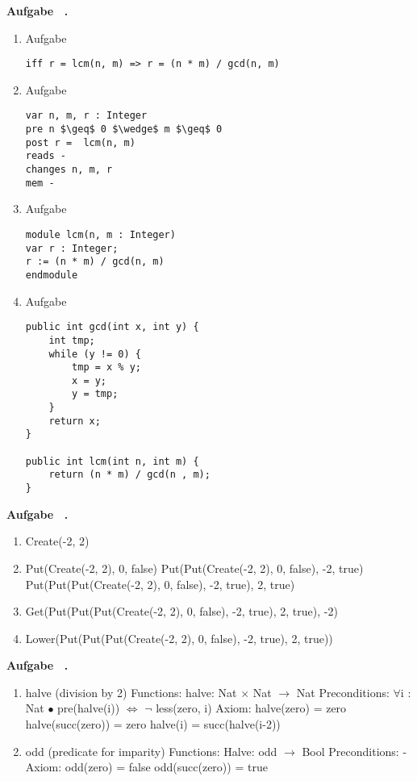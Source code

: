 \documentclass[a4paper,11pt]{article}             %
\def\vblatt{~}
\newcommand{\lstalg}{\lstset { numbers=left,language=alglang,tabsize=2,numberstyle=\tiny,style=algstyle}}
\newcounter{aufgabe}
\newcommand{\Aufgabe}{\noindent\newline\addtocounter{aufgabe}{1}\textbf{Aufgabe \vblatt.\theaufgabe}\\
}
\begin{document}
\Aufgabe
\begin{enumerate}

\item Aufgabe
\lstalg
\begin{lstlisting}
iff r = lcm(n, m) => r = (n * m) / gcd(n, m)
\end{lstlisting}

\item Aufgabe
\lstalg
\begin{lstlisting}
var n, m, r : Integer
pre n $\geq$ 0 $\wedge$ m $\geq$ 0
post r =  lcm(n, m)
reads -
changes n, m, r
mem -
\end{lstlisting}

\item Aufgabe
\lstalg
\begin{lstlisting}
module lcm(n, m : Integer)
var r : Integer;
r := (n * m) / gcd(n, m)
endmodule
\end{lstlisting}
\item Aufgabe
\begin{lstlisting}
public int gcd(int x, int y) {
	int tmp;
    while (y != 0) {
    	tmp = x % y;
        x = y;
        y = tmp;
    }
    return x;
}

public int lcm(int n, int m) {
	return (n * m) / gcd(n , m);
}
\end{lstlisting}

\end{enumerate}

\newpage

\Aufgabe
\begin{enumerate}
\item Create(-2, 2)
\item
	\subitem Put(Create(-2, 2), 0, false)
    \subitem Put(Put(Create(-2, 2), 0, false), -2, true)
    \subitem Put(Put(Put(Create(-2, 2), 0, false), -2, true), 2, true)
\item Get(Put(Put(Put(Create(-2, 2), 0, false), -2, true), 2, true), -2)
\item Lower(Put(Put(Put(Create(-2, 2), 0, false), -2, true), 2, true))

\end{enumerate}

\Aufgabe
\begin{enumerate}
\item halve (division by 2)
	\subitem Functions: 
    	\subsubitem halve: Nat $\times$ Nat $\rightarrow$ Nat
    \subitem Preconditions: 
    	\subsubitem $\forall$i : Nat $\bullet$ pre(halve(i)) $\iff$ $\neg$ less(zero, i)
	\subitem Axiom:
        \subsubitem halve(zero) = zero
        \subsubitem halve(succ(zero)) = zero
        \subsubitem halve(i) = succ(halve(i-2))
\item odd (predicate for imparity)
	\subitem Functions: 
    	\subsubitem Halve: odd $\rightarrow$ Bool
    \subitem Preconditions: 
    	\subsubitem -
	\subitem Axiom:
        \subsubitem odd(zero) = false
        \subsubitem odd(succ(zero)) = true
\end{enumerate}
\end{document}
